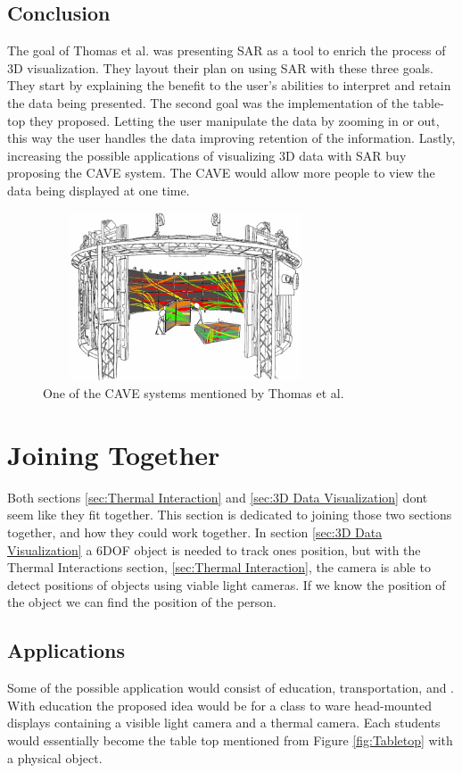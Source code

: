 \documentclass{sig-alternate}
\begin{document}
\subsection{Conclusion}
\label{sec:Conclusion}
The goal of Thomas et al. \cite{3D} was presenting SAR as a tool to enrich the process of 3D visualization. They layout their plan on using SAR with these three goals. They start by explaining the benefit to the user's abilities to interpret and retain the data being presented. The second goal was the implementation of the table-top they proposed. Letting the user manipulate the data by zooming in or out, this way the user handles the data improving retention of the information. Lastly, increasing the possible applications of visualizing 3D data with SAR buy proposing the CAVE system. The CAVE would allow more people to view the data being displayed at one time.

\begin{figure}
	\includegraphics[width=8.5cm, height=5cm]{Cave}
	\caption{One of the CAVE systems mentioned by Thomas et al. \cite{3D}}
	\label{fig:Cave}
\end{figure}  

\section{Joining Together}
\label{sec:Joining Together}
Both sections \ref{sec:Thermal Interaction} and \ref{sec:3D Data Visualization} dont seem like they fit together. This section is dedicated to joining those two sections together, and how they could work together. In section \ref{sec:3D Data Visualization} a 6DOF object is needed to track ones position, but with the Thermal Interactions section, \ref{sec:Thermal Interaction}, the camera is able to detect positions of objects using viable light cameras. If we know the position of the object we can find the position of the person.  

\subsection{Applications}
\label{Applications}
Some of the possible application would consist of education, transportation, and . With education the proposed idea would be for a class to ware head-mounted displays containing a visible light camera and a thermal camera. Each students would essentially become the table top mentioned from Figure \ref{fig:Tabletop} with a physical object.
\end{document}
